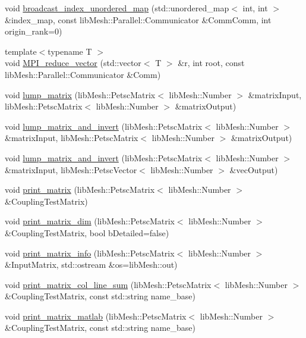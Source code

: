 \begin{DoxyCompactItemize}
\item 
void \hyperlink{namespacecarl_a9709628dd76d2b74384c5f82d77b3dda}{broadcast\+\_\+index\+\_\+unordered\+\_\+map} (std\+::unordered\+\_\+map$<$ int, int $>$ \&index\+\_\+map, const lib\+Mesh\+::\+Parallel\+::\+Communicator \&Comm\+Comm, int origin\+\_\+rank=0)
\item 
{\footnotesize template$<$typename T $>$ }\\void \hyperlink{namespacecarl_a461e9a455e02d991c920b4b56390f326}{M\+P\+I\+\_\+reduce\+\_\+vector} (std\+::vector$<$ T $>$ \&r, int root, const lib\+Mesh\+::\+Parallel\+::\+Communicator \&Comm)
\item 
void \hyperlink{namespacecarl_a21d667c7247b6c0f71917b99c39c50e6}{lump\+\_\+matrix} (lib\+Mesh\+::\+Petsc\+Matrix$<$ lib\+Mesh\+::\+Number $>$ \&matrix\+Input, lib\+Mesh\+::\+Petsc\+Matrix$<$ lib\+Mesh\+::\+Number $>$ \&matrix\+Output)
\item 
void \hyperlink{namespacecarl_a22f4ac1dab8f592b86201d3fec77b7f7}{lump\+\_\+matrix\+\_\+and\+\_\+invert} (lib\+Mesh\+::\+Petsc\+Matrix$<$ lib\+Mesh\+::\+Number $>$ \&matrix\+Input, lib\+Mesh\+::\+Petsc\+Matrix$<$ lib\+Mesh\+::\+Number $>$ \&matrix\+Output)
\item 
void \hyperlink{namespacecarl_aeb8a38b6b56135f6099cce3470494b23}{lump\+\_\+matrix\+\_\+and\+\_\+invert} (lib\+Mesh\+::\+Petsc\+Matrix$<$ lib\+Mesh\+::\+Number $>$ \&matrix\+Input, lib\+Mesh\+::\+Petsc\+Vector$<$ lib\+Mesh\+::\+Number $>$ \&vec\+Output)
\item 
void \hyperlink{namespacecarl_acf412e8527bfd67e81b80b71bf3bb479}{print\+\_\+matrix} (lib\+Mesh\+::\+Petsc\+Matrix$<$ lib\+Mesh\+::\+Number $>$ \&Coupling\+Test\+Matrix)
\item 
void \hyperlink{namespacecarl_a8ab4aecb3273c14a472f00cc892f95a0}{print\+\_\+matrix\+\_\+dim} (lib\+Mesh\+::\+Petsc\+Matrix$<$ lib\+Mesh\+::\+Number $>$ \&Coupling\+Test\+Matrix, bool b\+Detailed=false)
\item 
void \hyperlink{namespacecarl_a090760429d54397a47cdf55a73dcf078}{print\+\_\+matrix\+\_\+info} (lib\+Mesh\+::\+Petsc\+Matrix$<$ lib\+Mesh\+::\+Number $>$ \&Input\+Matrix, std\+::ostream \&os=lib\+Mesh\+::out)
\item 
void \hyperlink{namespacecarl_a074f0090ce9738ac74ffc852f11f9126}{print\+\_\+matrix\+\_\+col\+\_\+line\+\_\+sum} (lib\+Mesh\+::\+Petsc\+Matrix$<$ lib\+Mesh\+::\+Number $>$ \&Coupling\+Test\+Matrix, const std\+::string name\+\_\+base)
\item 
void \hyperlink{namespacecarl_a3c2be3b1f2d9ee68d43525da24e1751b}{print\+\_\+matrix\+\_\+matlab} (lib\+Mesh\+::\+Petsc\+Matrix$<$ lib\+Mesh\+::\+Number $>$ \&Coupling\+Test\+Matrix, const std\+::string name\+\_\+base)

\end{DoxyCompactItemize}
